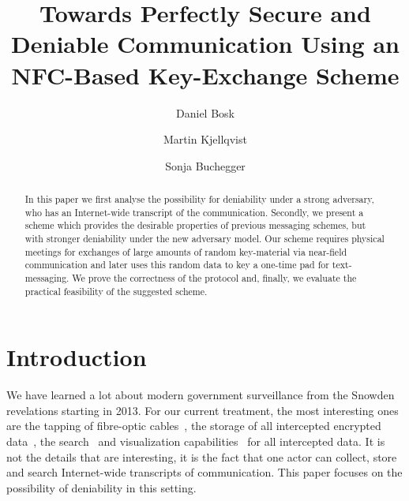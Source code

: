 \title{%
  Towards Perfectly Secure and Deniable Communication Using an NFC-Based 
  Key-Exchange Scheme
}
\author{%
  Daniel Bosk
  \and
  Martin Kjellqvist
  \and
  Sonja Buchegger
}

\maketitle
\begin{abstract}
  In this paper we first analyse the possibility for deniability under a strong 
  adversary, who has an Internet-wide transcript of the communication.
  Secondly, we present a scheme which provides the desirable properties of 
  previous messaging schemes, but with stronger deniability under the new 
  adversary model.
  Our scheme requires physical meetings for exchanges of large amounts of 
  random key-material via near-field communication and later uses this random 
  data to key a one-time pad for text-messaging.
  We prove the correctness of the protocol and, finally, we evaluate the 
  practical feasibility of the suggested scheme.

\end{abstract}

\acresetall{}
\section{Introduction}

We have learned a lot about modern government surveillance from the Snowden 
revelations starting in 2013.
For our current treatment, the most interesting ones are the tapping of 
fibre-optic cables~\cite{fibretap}, the storage of all intercepted encrypted 
data~\cite{cryptostore}, the search~\cite{xkeyscore} and visualization 
capabilities~\cite{boundlessinformant} for all intercepted data.
It is not the details that are interesting, it is the fact that one actor can 
collect, store and search Internet-wide transcripts of communication.
This paper focuses on the possibility of deniability in this setting.

